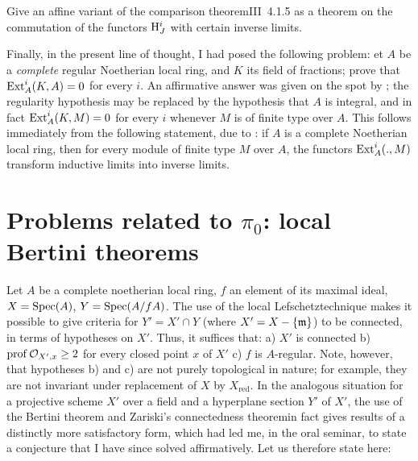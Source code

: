 \begin{probleme} \label{XIII.1.4}
Give an affine variant of the \og comparison theorem\fg \textup{\EGA III~4.1.5} as a theorem on the commutation of the functors $\mathrm H^i_J$ with certain inverse limits.
\end{probleme}

Finally, in the present line of thought, I had posed the following problem: et $A$ be a \emph{complete} regular Noetherian local ring, and $K$ its field of fractions; prove that $\operatorname{Ext}^i_A(K, A)=0$ for every $i$. An affirmative answer was given on the spot by ; the regularity hypothesis may be replaced by the hypothesis that $A$ is integral, and in fact $\operatorname{Ext}^i_A(K, M)=0$ for every $i$ whenever $M$ is of finite type over $A$. This follows immediately from the following statement, due to : if $A$ is a complete Noetherian local ring, then for every module of finite type $M$ over $A$, the functors $\operatorname{Ext}_A^i(., M)$ transform inductive limits into inverse limits.

\section{Problems related to $\pi_0$: local Bertini theorems} \label{XIII.2}

Let $A$ be a complete noetherian local ring, $f$ an element of its
maximal ideal, $X=\operatorname{Spec} (A)$, $Y=\operatorname{Spec}(A/fA)$. The use of the local
\og Lefschetz\fg technique makes it possible to give criteria
for $Y'=X'\cap Y$ (where $X'=X-\{\mathfrak{m}\}$) to be connected, in terms
of hypotheses on $X'$. Thus, it suffices that: a) $X'$\pageoriginale
is connected\sisi{}{,} b) $\operatorname{prof} \mathcal O_{X', x} \ge 2$ for every closed point $x$
of $X'$\sisi{}{,} c) $f$ is $A$-regular. Note, however, that
hypotheses b) and c) are not purely
topological in nature; for example, they are not invariant\sisi{}{}
under replacement of $X$ by $X_{\text{red}}$. In the analogous situation
for a projective scheme $X'$ over a field and a hyperplane
section $Y'$ of $X'$, the use of the \og Bertini theorem\fg
and Zariski's \og connectedness theorem\fg in fact gives
results of a distinctly more satisfactory form,
which had led me, in the oral seminar, to state
a conjecture that I have since solved affirmatively.
Let us therefore state here:

